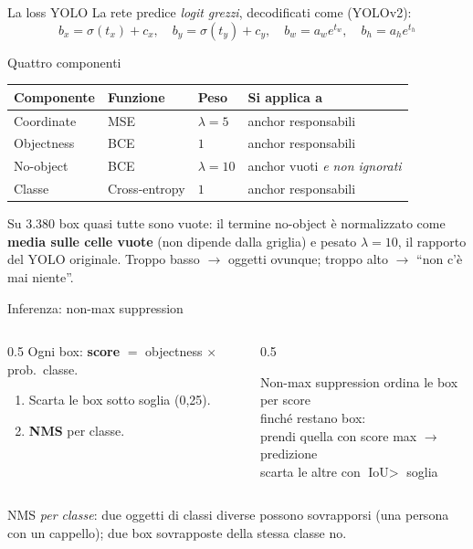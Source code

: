 \documentclass[aspectratio=169]{beamer}
\begin{document}
\begin{frame}{La loss YOLO}
  \small
  La rete predice \emph{logit grezzi}, decodificati come (YOLOv2):
  \[
    b_x=\sigma(t_x)+c_x,\quad b_y=\sigma(t_y)+c_y,\quad
    b_w=a_w e^{t_w},\quad b_h=a_h e^{t_h}
  \]
  \begin{block}{Quattro componenti}
    \centering
    \begin{tabular}{llll}
      \toprule
      Componente & Funzione & Peso & Si applica a \\
      \midrule
      Coordinate & MSE & $\lambda=5$ & anchor responsabili \\
      Objectness & BCE & $1$ & anchor responsabili \\
      No-object & BCE & $\lambda=10$ & anchor vuoti \emph{e non ignorati} \\
      Classe & Cross-entropy & $1$ & anchor responsabili \\
      \bottomrule
    \end{tabular}
  \end{block}
  Su 3.380 box quasi tutte sono vuote: il termine no-object è normalizzato come
  \textbf{media sulle celle vuote} (non dipende dalla griglia) e pesato $\lambda=10$,
  il rapporto del YOLO originale. Troppo basso $\to$ oggetti ovunque; troppo alto
  $\to$ \alert{``non c'è mai niente''}.
\end{frame}

\begin{frame}{Inferenza: non-max suppression}
  \begin{columns}[T]
    \begin{column}{0.5\textwidth}
      Ogni box: \textbf{score} $=$ objectness $\times$ prob.\ classe.
      \begin{enumerate}
        \item Scarta le box sotto soglia (0,25).
        \item \textbf{NMS} per classe.
      \end{enumerate}
    \end{column}
    \begin{column}{0.5\textwidth}
      \begin{block}{Non-max suppression}
        {\footnotesize
        ordina le box per score\\
        finché restano box:\\
        \quad prendi quella con score max $\to$ predizione\\
        \quad scarta le altre con $\text{IoU}>$ soglia}
      \end{block}
    \end{column}
  \end{columns}
  \vspace{0.2cm}
  NMS \emph{per classe}: due oggetti di classi diverse possono sovrapporsi (una
  persona con un cappello); due box sovrapposte della stessa classe no.
\end{frame}
\end{document}
